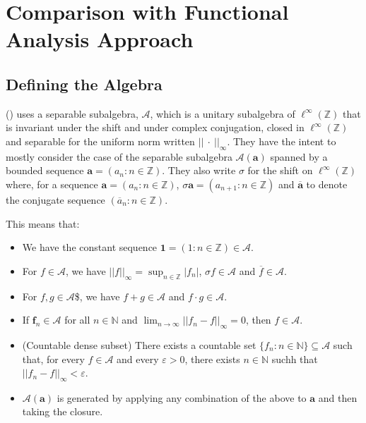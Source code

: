 \documentclass[
  british,
]{article}
\providecommand{\tightlist}{%
  \setlength{\itemsep}{0pt}\setlength{\parskip}{0pt}}
\theoremstyle{plain}
\theoremstyle{remark}
\begin{document}
\section{Comparison with Functional Analysis
Approach}\label{comparison-with-functional-analysis-approach}

\subsection{Defining the Algebra}\label{defining-the-algebra}

() uses a
separable subalgebra, \(\mathcal{A}\), which is a unitary subalgebra of
\(\ell^\infty(\mathbb{Z})\) that is invariant under the shift and under
complex conjugation, closed in \(\ell^\infty(\mathbb{Z})\) and separable
for the uniform norm written \(||\ \cdot\ ||_\infty\). They have the
intent to mostly consider the case of the separable subalgebra
\(\mathcal{A}(\boldsymbol{a})\) spanned by a bounded sequence
\(\boldsymbol{a}=(a_n:n\in\mathbb{Z})\). They also write \(\sigma\) for
the shift on \(\ell^\infty(\mathbb{Z})\) where, for a sequence
\(\boldsymbol{a}=(a_n:n\in\mathbb{Z})\),
\(\sigma\boldsymbol{a}=(a_{n+1}:n\in\mathbb{Z})\) and
\(\overline{\boldsymbol{a}}\) to denote the conjugate sequence
\((\overline{a}_n:n\in\mathbb{Z})\).

This means that:

\begin{itemize}
\tightlist
\item
  We have the constant sequence
  \(\boldsymbol{1}=(1:n\in\mathbb{Z})\in\mathcal{A}\).
\item
  For \(f\in\mathcal{A}\), we have
  \(||f||_\infty=\sup_{n\in\mathbb{Z}}|f_n|\),
  \(\sigma f\in\mathcal{A}\) and \(\overline{f}\in\mathcal{A}\).
\item
  For \(f,g\in\mathcal{A}\)\$, we have \(f+g\in\mathcal{A}\) and
  \(f\cdot g\in\mathcal{A}\).
\item
  If \(\boldsymbol{f}_n\in\mathcal{A}\) for all \(n\in\mathbb{N}\) and
  \(\lim_{n\rightarrow\infty}||f_n-f||_\infty=0\), then
  \(f\in\mathcal{A}\).
\item
  (Countable dense subset) There exists a countable set
  \(\{f_n:n\in\mathbb{N}\}\subseteq\mathcal{A}\) such that, for every
  \(f\in\mathcal{A}\) and every \(\varepsilon>0\), there exists
  \(n\in\mathbb{N}\) suchh that \(||f_n-f||_\infty<\varepsilon\).
\item
  \(\mathcal{A}(\boldsymbol{a})\) is generated by applying any
  combination of the above to \(\boldsymbol{a}\) and then taking the
  closure.
\end{itemize}
\end{document}
